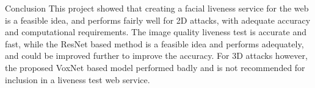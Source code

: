 \documentclass[final]{beamer}
\begin{document}
\begin{frame}{}
\begin{columns}[t]
\begin{column}{.48\linewidth}
        \begin{block}{Conclusion}
          This project showed that creating a facial liveness service for the web is a feasible idea, and performs fairly well for 2D attacks, with adequate accuracy and computational requirements.
          The image quality liveness test is accurate and fast, while the ResNet based method is a feasible idea and performs adequately, and could be improved further to improve the accuracy. For 3D attacks however, the
          proposed VoxNet based model performed badly and is not recommended for inclusion in a liveness test web service.

        \end{block}
      \end{column}
    \end{columns}


  \end{frame}
\end{document}
